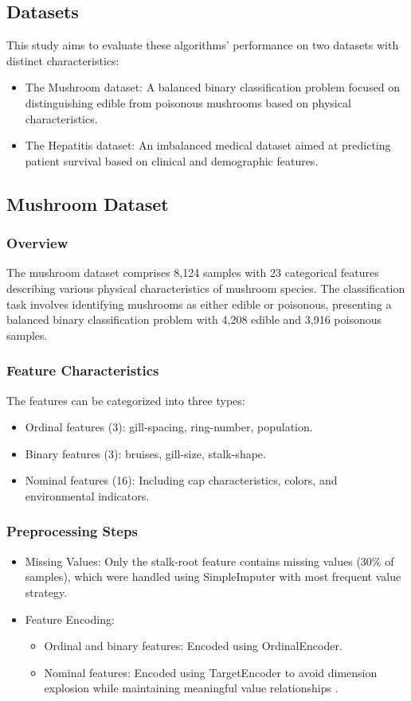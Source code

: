 \subsection{Datasets}

This study aims to evaluate these algorithms' performance on two datasets with distinct characteristics:
\begin{itemize}
	\item The Mushroom dataset: A balanced binary classification problem focused on distinguishing edible from poisonous mushrooms based on physical characteristics.
	\item The Hepatitis dataset: An imbalanced medical dataset aimed at predicting patient survival based on clinical and demographic features.
\end{itemize}

\subsection{Mushroom Dataset}
\subsubsection{Overview}
The mushroom dataset comprises 8,124 samples with 23 categorical features describing various physical characteristics of mushroom species. The classification task involves identifying mushrooms as either edible or poisonous, presenting a balanced binary classification problem with 4,208 edible and 3,916 poisonous samples.

\subsubsection{Feature Characteristics}
The features can be categorized into three types:
\begin{itemize}
	\item Ordinal features (3): gill-spacing, ring-number, population.
	\item Binary features (3): bruises, gill-size, stalk-shape.
	\item Nominal features (16): Including cap characteristics, colors, and environmental indicators.
\end{itemize}

\subsubsection{Preprocessing Steps}
\begin{itemize}
	\item Missing Values: Only the stalk-root feature contains missing values (30\% of samples), which were handled using SimpleImputer with most frequent value strategy.
	\item Feature Encoding:
	\begin{itemize}
		\item Ordinal and binary features: Encoded using OrdinalEncoder.
		\item Nominal features: Encoded using TargetEncoder to avoid dimension explosion while maintaining meaningful value relationships \cite{Micci-Barreca}.
	\end{itemize}
\end{itemize}

